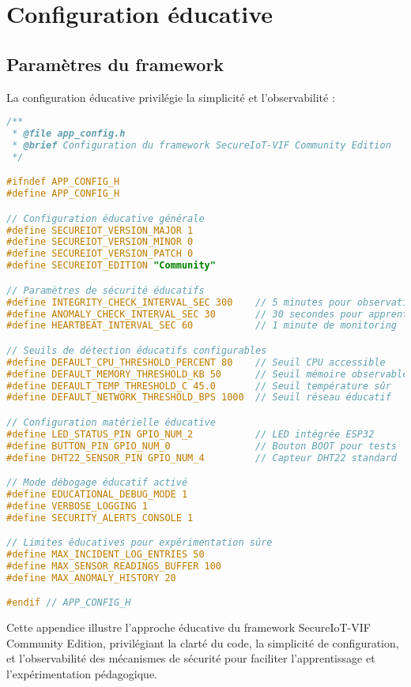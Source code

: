 \section{Configuration éducative}

\subsection{Paramètres du framework}

La configuration éducative privilégie la simplicité et l'observabilité :

\begin{lstlisting}[language=C, caption={Configuration éducative - app\_config.h}, label=lst:app-config]
/**
 * @file app_config.h
 * @brief Configuration du framework SecureIoT-VIF Community Edition
 */

#ifndef APP_CONFIG_H
#define APP_CONFIG_H

// Configuration éducative générale
#define SECUREIOT_VERSION_MAJOR 1
#define SECUREIOT_VERSION_MINOR 0  
#define SECUREIOT_VERSION_PATCH 0
#define SECUREIOT_EDITION "Community"

// Paramètres de sécurité éducatifs
#define INTEGRITY_CHECK_INTERVAL_SEC 300    // 5 minutes pour observation
#define ANOMALY_CHECK_INTERVAL_SEC 30       // 30 secondes pour apprentissage
#define HEARTBEAT_INTERVAL_SEC 60           // 1 minute de monitoring

// Seuils de détection éducatifs configurables
#define DEFAULT_CPU_THRESHOLD_PERCENT 80    // Seuil CPU accessible
#define DEFAULT_MEMORY_THRESHOLD_KB 50      // Seuil mémoire observable  
#define DEFAULT_TEMP_THRESHOLD_C 45.0       // Seuil température sûr
#define DEFAULT_NETWORK_THRESHOLD_BPS 1000  // Seuil réseau éducatif

// Configuration matérielle éducative
#define LED_STATUS_PIN GPIO_NUM_2           // LED intégrée ESP32
#define BUTTON_PIN GPIO_NUM_0               // Bouton BOOT pour tests
#define DHT22_SENSOR_PIN GPIO_NUM_4         // Capteur DHT22 standard

// Mode débogage éducatif activé
#define EDUCATIONAL_DEBUG_MODE 1
#define VERBOSE_LOGGING 1
#define SECURITY_ALERTS_CONSOLE 1

// Limites éducatives pour expérimentation sûre
#define MAX_INCIDENT_LOG_ENTRIES 50
#define MAX_SENSOR_READINGS_BUFFER 100
#define MAX_ANOMALY_HISTORY 20

#endif // APP_CONFIG_H
\end{lstlisting}

Cette appendice illustre l'approche éducative du framework SecureIoT-VIF Community Edition, privilégiant la clarté du code, la simplicité de configuration, et l'observabilité des mécanismes de sécurité pour faciliter l'apprentissage et l'expérimentation pédagogique.